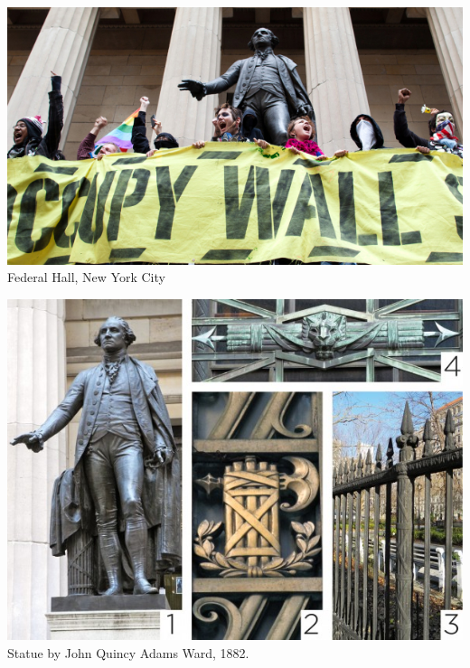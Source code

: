 \begin{frame}
    \centering
    \includegraphics[width=.9\textwidth]{img/fasces/ows.jpg} \\
    Federal Hall, New York City \\
\end{frame}
\begin{frame}
    \centering
    \includegraphics[width=.9\textwidth]{img/fasces/fasces-stuff.jpg} \\
    Statue by John Quincy Adams Ward, 1882.
\end{frame}
